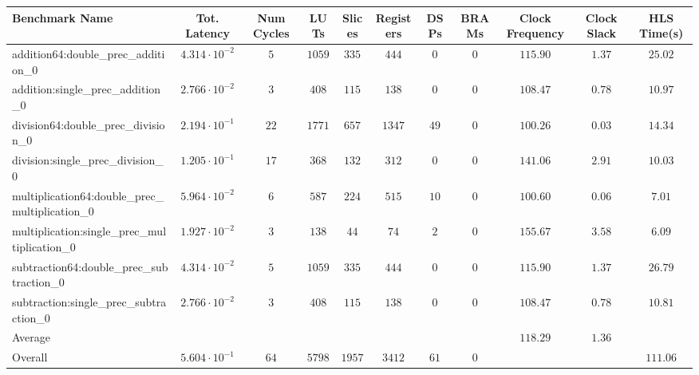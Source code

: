 \begin{tabular}{|l|c|c|c|c|c|c|c|c|c|c|}
\hline
Benchmark Name                                   & Tot. Latency            & Num Cycles & LUTs     & Slices   & Registers & DSPs   & BRAMs & Clock Frequency & Clock Slack & HLS Time(s) \\
\hline
addition64:double\_prec\_addition\_0             & $ 4.314 \cdot 10^{-2} $ & $ 5      $ & $ 1059 $ & $ 335  $ & $ 444   $ & $ 0  $ & $ 0 $ & $ 115.90      $ & $ 1.37    $ & $ 25.02   $ \\
addition:single\_prec\_addition\_0               & $ 2.766 \cdot 10^{-2} $ & $ 3      $ & $ 408  $ & $ 115  $ & $ 138   $ & $ 0  $ & $ 0 $ & $ 108.47      $ & $ 0.78    $ & $ 10.97   $ \\
division64:double\_prec\_division\_0             & $ 2.194 \cdot 10^{-1} $ & $ 22     $ & $ 1771 $ & $ 657  $ & $ 1347  $ & $ 49 $ & $ 0 $ & $ 100.26      $ & $ 0.03    $ & $ 14.34   $ \\
division:single\_prec\_division\_0               & $ 1.205 \cdot 10^{-1} $ & $ 17     $ & $ 368  $ & $ 132  $ & $ 312   $ & $ 0  $ & $ 0 $ & $ 141.06      $ & $ 2.91    $ & $ 10.03   $ \\
multiplication64:double\_prec\_multiplication\_0 & $ 5.964 \cdot 10^{-2} $ & $ 6      $ & $ 587  $ & $ 224  $ & $ 515   $ & $ 10 $ & $ 0 $ & $ 100.60      $ & $ 0.06    $ & $ 7.01    $ \\
multiplication:single\_prec\_multiplication\_0   & $ 1.927 \cdot 10^{-2} $ & $ 3      $ & $ 138  $ & $ 44   $ & $ 74    $ & $ 2  $ & $ 0 $ & $ 155.67      $ & $ 3.58    $ & $ 6.09    $ \\
subtraction64:double\_prec\_subtraction\_0       & $ 4.314 \cdot 10^{-2} $ & $ 5      $ & $ 1059 $ & $ 335  $ & $ 444   $ & $ 0  $ & $ 0 $ & $ 115.90      $ & $ 1.37    $ & $ 26.79   $ \\
subtraction:single\_prec\_subtraction\_0         & $ 2.766 \cdot 10^{-2} $ & $ 3      $ & $ 408  $ & $ 115  $ & $ 138   $ & $ 0  $ & $ 0 $ & $ 108.47      $ & $ 0.78    $ & $ 10.81   $ \\
\hline
Average                                          & $                     $ & $        $ & $      $ & $      $ & $       $ & $    $ & $   $ & $ 118.29      $ & $ 1.36    $ & $         $ \\
\hline
Overall                                          & $ 5.604 \cdot 10^{-1} $ & $ 64     $ & $ 5798 $ & $ 1957 $ & $ 3412  $ & $ 61 $ & $ 0 $ & $             $ & $         $ & $ 111.06  $ \\
\hline
\end{tabular}
